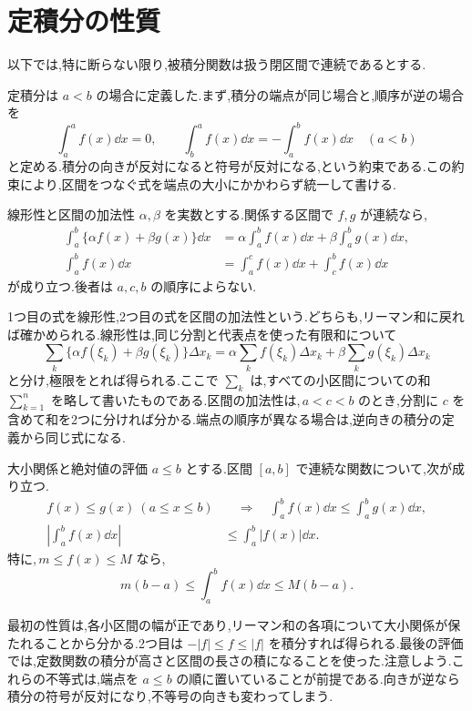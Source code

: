 \section{定積分の性質}\label{節:定積分性質}
以下では,特に断らない限り,被積分関数は扱う閉区間で連続であるとする.

定積分は $a<b$ の場合に定義した.まず,積分の端点が同じ場合と,順序が逆の場合を
\[
 \int_a^a f(x)\dd x=0,\qquad
 \int_b^a f(x)\dd x=-\int_a^b f(x)\dd x\quad(a<b)
\]
と定める.積分の向きが反対になると符号が反対になる,という約束である.この約束により,区間をつなぐ式を端点の大小にかかわらず統一して書ける.

\begin{theorem}{線形性と区間の加法性}\label{定理:積分基本性質}
$\alpha,\beta$ を実数とする.関係する区間で $f,g$ が連続なら,
\begin{align*}
 \int_a^b\{\alpha f(x)+\beta g(x)\}\dd x
 &=\alpha\int_a^b f(x)\dd x+\beta\int_a^b g(x)\dd x,\\
 \int_a^b f(x)\dd x
 &=\int_a^c f(x)\dd x+\int_c^b f(x)\dd x
\end{align*}
が成り立つ.後者は $a,c,b$ の順序によらない.
\end{theorem}

1つ目の式を線形性,2つ目の式を区間の加法性という.どちらも,リーマン和に戻れば確かめられる.線形性は,同じ分割と代表点を使った有限和について
\[
 \sum_k\{\alpha f(\xi_k)+\beta g(\xi_k)\}\Delta x_k
 =\alpha\sum_k f(\xi_k)\Delta x_k
  +\beta\sum_k g(\xi_k)\Delta x_k
\]
と分け,極限をとれば得られる.ここで $\sum_k$ は,すべての小区間についての和 $\sum_{k=1}^{n}$ を略して書いたものである.区間の加法性は,\,$a<c<b$ のとき,分割に $c$ を含めて和を2つに分ければ分かる.端点の順序が異なる場合は,逆向きの積分の定義から同じ式になる.

\begin{theorem}{大小関係と絶対値の評価}\label{定理:積分評価}
$a\le b$ とする.区間 $[a,b]$ で連続な関数について,次が成り立つ.
\begin{align*}
 f(x)\le g(x)\ (a\le x\le b)
 &\quad\Longrightarrow\quad
 \int_a^b f(x)\dd x\le\int_a^b g(x)\dd x,\\
 \left|\int_a^b f(x)\dd x\right|
 &\le\int_a^b|f(x)|\dd x.
\end{align*}
特に,\,$m\le f(x)\le M$ なら,
\[
 m(b-a)\le\int_a^b f(x)\dd x\le M(b-a).
\]
\end{theorem}

最初の性質は,各小区間の幅が正であり,リーマン和の各項について大小関係が保たれることから分かる.2つ目は $-|f|\le f\le|f|$ を積分すれば得られる.最後の評価では,定数関数の積分が高さと区間の長さの積になることを使った.注意しよう.これらの不等式は,端点を $a\le b$ の順に置いていることが前提である.向きが逆なら積分の符号が反対になり,不等号の向きも変わってしまう.

